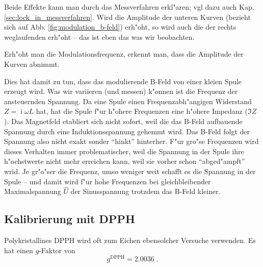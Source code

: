 \documentclass[a4paper,12pt]{article}
\newcommand{\I}{\ensuremath{\operatorname{i}}}
\newcommand{\abs}[0]{\bigskip\noindent}
\begin{document}
Beide Effekte kann man durch das Messverfahren erkl"aren; vgl dazu
auch Kap. \ref{sec:lock_in_messverfahren}.  Wird die Amplitude der
unteren Kurven (bezieht sich auf Abb. \ref{fig:modulation_b-feld})
erh"oht, so wird auch die der rechts weglaufenden erh"oht -- das ist
eben das was wir beobachten. 




\abs
%
Erh"oht  man die Modulationsfrequenz, erkennt man, dass die Amplitude
der Kurven abnimmt. 



Dies hat damit zu tun, dass das modulierende B-Feld von einer kleien
Spule erzeugt wird. Was wir variieren (und messen) k"onnen ist die
Frequenz der ansteuernden Spannung. Da eine Spule einen
Frequenzabh"angigen Widerstand $Z = \I \omega L$ hat, hat die Spule
f"ur h"ohere Frequenzen eine h"ohere Impedanz ($\Im Z$). Das
Magnetfeld etabliert sich nicht sofort, weil die das B-Feld aufbauende
Spannung durch eine Induktionsspannung gehemmt wird. Das B-Feld folgt
der Spannung also nicht exakt sonder "`hinkt"' hinterher. F"ur gro"se
Frequenzen wird dieses Verhalten immer problematischer, weil die
Spannung in der Spule ihre h"ochstwerte nicht mehr erreichen kann,
weil sie vorher schon "`abged"ampft"' wrid. Je gr"o"ser die Frequenz,
umso weniger weit schafft es die Spannung in der Spule -- und damit
wird f"ur hohe Frequenzen bei gleichbleibender Maximalspannung $\hat
U$ der Sinusspannung trotzdem das B-Feld kleiner.










\subsection{Kalibrierung mit DPPH}
\label{sec:kalibrierung_mit_dpph}

Polykristallines DPPH wird oft zum Eichen ebensolcher Versuche
verwenden. Es hat einen $g$-Faktor von
\begin{equation}
  \label{eq:7}
  g^\text{DPPH} = 2.0036 \;.
\end{equation}
\end{document}
